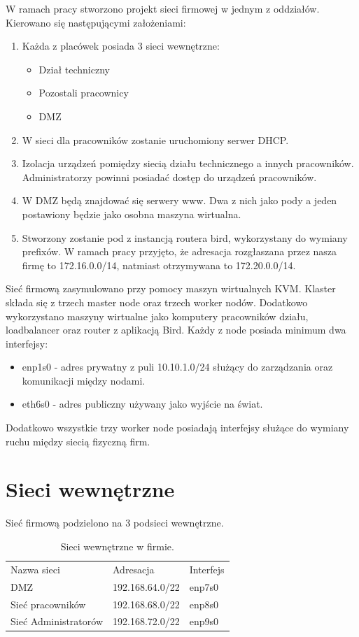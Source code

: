 \documentclass[pl,final,oneside]{mgr} %
\begin{document}
W ramach pracy stworzono projekt sieci firmowej w jednym z oddziałów. Kierowano się następującymi założeniami:
\begin{enumerate}

	\item Każda z placówek posiada 3 sieci wewnętrzne:
	\begin{itemize}
		\item Dział techniczny
		\item Pozostali pracownicy
		\item DMZ
	\end{itemize}

	\item W sieci dla pracowników zostanie uruchomiony serwer DHCP.
	\item Izolacja urządzeń pomiędzy siecią działu technicznego a innych pracowników. Administratorzy powinni posiadać dostęp do urządzeń pracowników.
	\item W DMZ będą znajdować się serwery www. Dwa z nich jako pody a jeden postawiony będzie jako osobna maszyna wirtualna.
	\item Stworzony zostanie pod z instancją routera bird, wykorzystany do wymiany prefixów. W ramach pracy przyjęto, że adresacja rozgłaszana przez nasza firmę to 172.16.0.0/14, natmiast otrzymywana to 172.20.0.0/14. 
\end{enumerate}
Sieć firmową zasymulowano przy pomocy maszyn wirtualnych KVM. Klaster składa się z trzech master node oraz trzech worker nodów. Dodatkowo wykorzystano maszyny wirtualne jako komputery pracowników działu, loadbalancer oraz router z aplikacją Bird. Każdy z node posiada minimum dwa interfejsy:
\begin{itemize}
	\item enp1s0 - adres prywatny z puli 10.10.1.0/24 służący do zarządzania oraz komunikacji między nodami.
	\item eth6s0 - adres publiczny używany jako wyjście na świat.
\end{itemize}
Dodatkowo wszystkie trzy worker node posiadają interfejsy służące do wymiany ruchu między siecią fizyczną firm.


\section{Sieci wewnętrzne}
Sieć firmową podzielono na 3 podsieci wewnętrzne.
\begin{table}[]
	\begin{tabular}{lll}
		Nazwa sieci          & Adresacja       & Interfejs \\
		DMZ                  & 192.168.64.0/22 & enp7s0    \\
		Sieć pracowników     & 192.168.68.0/22 & enp8s0    \\
		Sieć Administratorów & 192.168.72.0/22 & enp9s0   
	\end{tabular}
	\label{tab:adresacje}
	\caption{Sieci wewnętrzne w firmie.}
\end{table}
\end{document}
